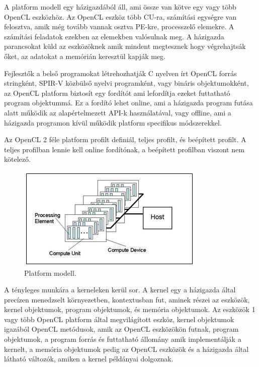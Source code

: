A platform modell egy házigazdából áll, ami össze van kötve egy vagy több OpenCL eszközhöz. Az OpenCL eszköz több CU-ra, számítási egységre van felosztva, amik még tovább vannak osztva PE-kre, processzelő elemekre. A számítási feladatok ezekben az elemekben valósulnak meg. A házigazda parancsokat küld az eszközöknek amik mindent megtesznek hogy végrehajtsák őket, az adatokat a memórián keresztül kapják meg. 

Fejlesztők a belső programokat létrehozhatják C nyelven írt OpenCL forrás stringként, SPIR-V közbülső nyelvi programként, vagy bináris objektumokként, az OpenCL platform biztosít egy fordítót ami lefordítja ezeket futtatható program objektummá. Ez a fordító lehet online, ami a házigazda program futása alatt működik az alapértelmezett API-k használatával, vagy offline, ami a házigazda programon kívül működik platform specifikus módszerekkel.

Az OpenCL 2 féle platform profilt definiál, teljes profilt, és beépített profilt. A teljes profilban lennie kell online fordítónak, a beépített profilban viszont nem kötelező.

\begin{figure}[h]
\centering
\includegraphics[scale=1.0]{images/platform_modell.jpg}
\caption{Platform modell.}
\label{fig:platform_modell}
\end{figure}

A tényleges munkára a kerneleken kerül sor. A kernel egy a házigazda által precízen menedzselt környezetben, kontextusban fut, aminek részei az eszközök, kernel objektumok, program objektumok, és memória objektumok. Az eszközök 1 vagy több OpenCL platform által megvilágított eszköz, kernel objektumok igazából OpenCL metódusok, amik az OpenCL eszközökön futnak, program objektumok, a program forrás és futtatható állomány amik implementálják a kernelt, a memória objektumok pedig az OpenCL eszközök és a házigazda által látható változók, amiken a kernel példányai dolgoznak.

